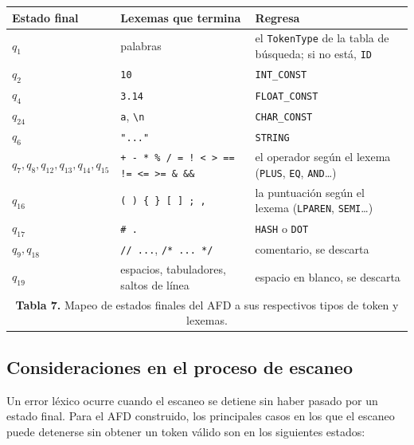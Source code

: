 \documentclass[12pt,letterpaper]{article}
\newcommand{\cd}[1]{\texttt{#1}}                       %
\begin{document}
\begin{center}
\small
\begin{tabularx}{\textwidth}{@{}l p{4.6cm} X@{}}
\toprule
\textbf{Estado final} & \textbf{Lexemas que termina} & \textbf{Regresa} \\
\midrule
$q_1$ & palabras & el \cd{TokenType} de la tabla de búsqueda; si no está, \cd{ID} \\
$q_2$ & \cd{10} & \cd{INT\_CONST} \\
$q_4$ & \cd{3.14} & \cd{FLOAT\_CONST} \\
$q_{24}$ & \cd{\textquotesingle a\textquotesingle}, \cd{\textquotesingle\textbackslash n\textquotesingle} & \cd{CHAR\_CONST} \\
$q_6$ & \cd{"..."} & \cd{STRING} \\
$q_7, q_8, q_{12}, q_{13}, q_{14}, q_{15}$ & \cd{+ - * \% / = ! < > == != <= >= \& \&\& \textbar\ \textbar\textbar} & el operador según el lexema (\cd{PLUS}, \cd{EQ}, \cd{AND}\ldots) \\
$q_{16}$ & \cd{( ) \{ \} [ ] ; ,} & la puntuación según el lexema (\cd{LPAREN}, \cd{SEMI}\ldots) \\
$q_{17}$ & \cd{\# .} & \cd{HASH} o \cd{DOT} \\
$q_9, q_{18}$ & \cd{// ...}, \cd{/* ... */} & comentario, se descarta \\
$q_{19}$ & espacios, tabuladores, saltos de línea & espacio en blanco, se descarta \\
\bottomrule
\multicolumn{3}{c}{\vspace{2pt}\footnotesize \textbf{Tabla 7.} Mapeo de estados finales del AFD a sus respectivos tipos de token y lexemas.} \\
\end{tabularx}
\end{center}

\subsection{Consideraciones en el proceso de escaneo}

Un error léxico ocurre cuando el escaneo se detiene sin haber pasado por un estado final. Para el AFD construido, los principales casos en los que el escaneo puede detenerse sin obtener un token válido son en los siguientes estados:
\end{document}
